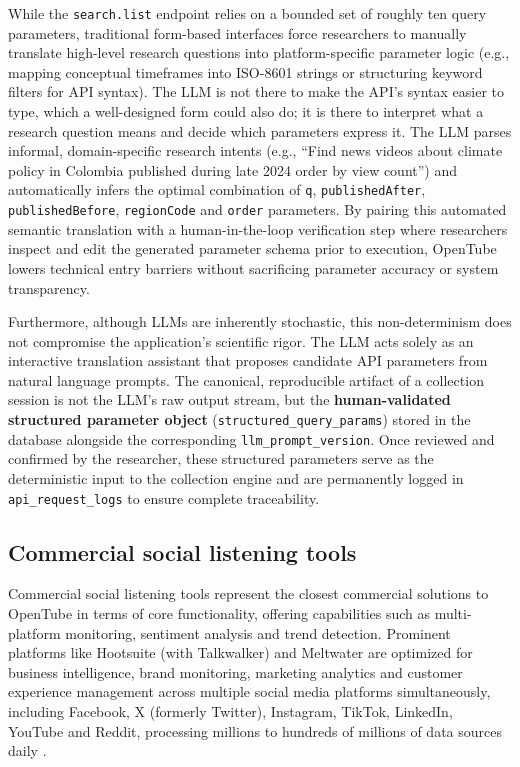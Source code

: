 While the \texttt{search.list} endpoint relies on a bounded set of roughly ten query parameters, traditional form-based interfaces force researchers to manually translate high-level research questions into platform-specific parameter logic (e.g., mapping conceptual timeframes into ISO-8601 strings or structuring keyword filters for API syntax). The LLM is not there to make the API's syntax easier to type, which a well-designed form could also do; it is there to interpret what a research question means and decide which parameters express it. The LLM parses informal, domain-specific research intents (e.g., \enquote{Find news videos about climate policy in Colombia published during late 2024 order by view count}) and automatically infers the optimal combination of \texttt{q}, \texttt{publishedAfter}, \texttt{publishedBefore}, \texttt{regionCode} and \texttt{order} parameters. By pairing this automated semantic translation with a human-in-the-loop verification step where researchers inspect and edit the generated parameter schema prior to execution, OpenTube lowers technical entry barriers without sacrificing parameter accuracy or system transparency.

Furthermore, although LLMs are inherently stochastic, this non-determinism does not compromise the application's scientific rigor. The LLM acts solely as an interactive translation assistant that proposes candidate API parameters from natural language prompts. The canonical, reproducible artifact of a collection session is not the LLM's raw output stream, but the \textbf{human-validated structured parameter object} (\texttt{structured\_query\_params}) stored in the database alongside the corresponding \texttt{llm\_prompt\_version}. Once reviewed and confirmed by the researcher, these structured parameters serve as the deterministic input to the collection engine and are permanently logged in \texttt{api\_request\_logs} to ensure complete traceability.

\subsection{Commercial social listening tools}

Commercial social listening tools represent the closest commercial solutions to OpenTube in terms of core functionality, offering capabilities such as multi-platform monitoring, sentiment analysis and trend detection. Prominent platforms like Hootsuite (with Talkwalker) and Meltwater are optimized for business intelligence, brand monitoring, marketing analytics and customer experience management across multiple social media platforms simultaneously, including Facebook, X (formerly Twitter), Instagram, TikTok, LinkedIn, YouTube and Reddit, processing millions to hundreds of millions of data sources daily \autocite{talkwalker, meltwater}.

